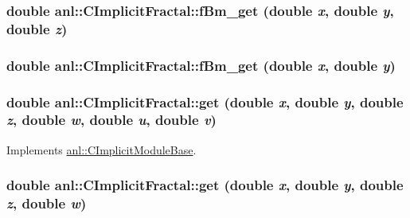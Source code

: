 \label{classanl_1_1CImplicitFractal_a3b06159c0b1cefbeeeb92d7af4884671}
\hypertarget{classanl_1_1CImplicitFractal_a5cab5811294494481b6192e363fa1f0b}{
\subsubsection[{fBm\_\-get}]{\setlength{\rightskip}{0pt plus 5cm}double anl::CImplicitFractal::fBm\_\-get (double {\em x}, \/  double {\em y}, \/  double {\em z})}}
\label{classanl_1_1CImplicitFractal_a5cab5811294494481b6192e363fa1f0b}
\hypertarget{classanl_1_1CImplicitFractal_a2cb0ace77e8510310288c952980fb679}{
\subsubsection[{fBm\_\-get}]{\setlength{\rightskip}{0pt plus 5cm}double anl::CImplicitFractal::fBm\_\-get (double {\em x}, \/  double {\em y})}}
\label{classanl_1_1CImplicitFractal_a2cb0ace77e8510310288c952980fb679}
\hypertarget{classanl_1_1CImplicitFractal_ad70eef24b8616b72b7319f10cc1be82d}{
\subsubsection[{get}]{\setlength{\rightskip}{0pt plus 5cm}double anl::CImplicitFractal::get (double {\em x}, \/  double {\em y}, \/  double {\em z}, \/  double {\em w}, \/  double {\em u}, \/  double {\em v})}}
\label{classanl_1_1CImplicitFractal_ad70eef24b8616b72b7319f10cc1be82d}


Implements \hyperlink{classanl_1_1CImplicitModuleBase_aa40b7d54572197612a4fea44b63447eb}{anl::CImplicitModuleBase}.\hypertarget{classanl_1_1CImplicitFractal_a39627567ff6ca149513d0870592f1f8e}{
\subsubsection[{get}]{\setlength{\rightskip}{0pt plus 5cm}double anl::CImplicitFractal::get (double {\em x}, \/  double {\em y}, \/  double {\em z}, \/  double {\em w})}}
\label{classanl_1_1CImplicitFractal_a39627567ff6ca149513d0870592f1f8e}



